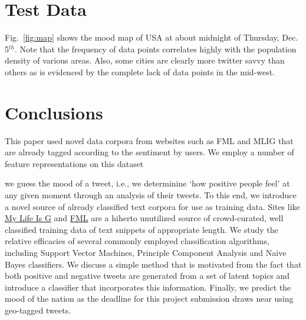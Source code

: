 \documentclass[11pt, letterpaper, conference, final, twocolumn]{ieeeconf}
\begin{document}
\section{Test Data}
\label{sec:test_data}

Fig.~\ref{fig:map} shows the mood map of USA at about midnight of Thursday, Dec. 5$^{th}$. Note that the frequency of data points correlates highly with the population density of various areas. Also, some cities are clearly more twitter savvy than others as is evidenced by the complete lack of data points in the mid-west. 

\section{Conclusions}
This paper used novel data corpora from websites such as FML and MLIG that are already tagged according to the sentiment by users. We employ a number of feature representations on this dataset 

we guess the mood of a tweet, i.e., we determinine `how positive people feel' at any given moment through an analysis of their tweets. To this end, we introduce a novel source of already classified text corpora for use as training data. Sites like \href{http://mylifeisg.com}{My Life Is G} and \href{http://fmylife.com}{FML} are a hiherto unutilized source of crowd-curated, well classified training data of text snippets of appropriate length. 
We study the relative efficacies of several commonly employed classification algorithms, including Support Vector Machines, Principle Component Analysis and Naive Bayes classifiers. We discuss a simple method that is motivated from the fact that both positive and negative tweets are generated from a set of latent topics and introduce a classifier that incorporates this information. Finally, we predict the mood of the nation as the deadline for this project submission draws near using geo-tagged tweets.



\end{document}
